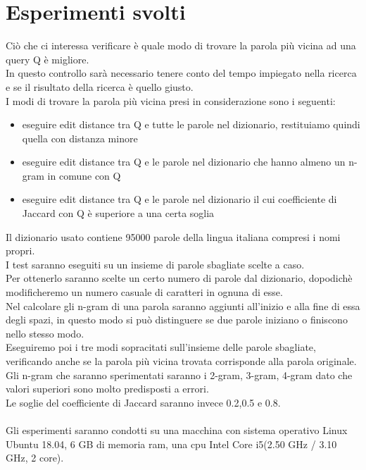 \documentclass[]{article}
\begin{document}
\section{Esperimenti svolti}
Ciò che ci interessa verificare è quale modo di trovare la parola più vicina ad una query Q è migliore.\\
In questo controllo sarà necessario tenere conto del tempo impiegato nella ricerca e se il risultato della ricerca è quello giusto.\\
I modi di trovare la parola più vicina presi in considerazione sono i seguenti:\\
\begin{itemize}
\item eseguire edit distance tra Q e tutte le parole nel dizionario, restituiamo quindi quella con distanza minore
\item eseguire edit distance tra Q e le parole nel dizionario che hanno almeno un n-gram in comune con Q
\item eseguire edit distance tra Q e le parole nel dizionario il cui coefficiente di Jaccard con Q è superiore a una certa soglia
\end{itemize}
Il dizionario usato contiene 95000 parole della lingua italiana compresi i nomi propri.\\
I test saranno eseguiti su un insieme di parole sbagliate scelte a caso.\\
Per ottenerlo saranno scelte un certo numero di parole dal dizionario, dopodichè modificheremo un numero casuale di caratteri in ognuna di esse.\\
Nel calcolare gli n-gram di una parola saranno aggiunti all'inizio e alla fine di essa degli spazi, in questo modo si può distinguere se due parole iniziano o finiscono nello stesso modo.\\ 
Eseguiremo poi i tre modi sopracitati sull'insieme delle parole sbagliate, verificando anche se la parola più vicina trovata corrisponde alla parola originale.\\
Gli n-gram che saranno sperimentati saranno i 2-gram, 3-gram, 4-gram dato che valori superiori sono molto predisposti a errori.\\
Le soglie del coefficiente di Jaccard saranno invece 0.2,0.5 e 0.8.\\\\
Gli esperimenti saranno condotti su una macchina con sistema operativo Linux Ubuntu 18.04, 6 GB di memoria ram, una cpu Intel Core i5(2.50 GHz / 3.10 GHz, 2 core).
\end{document}
